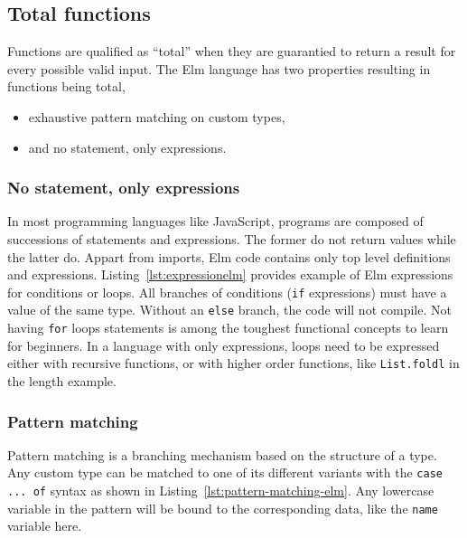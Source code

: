 


\subsection{Total functions}%
\label{sub:total_functions}

Functions are qualified as ``total'' when they are guarantied
to return a result for every possible valid input.
The Elm language has two properties resulting in functions being total,
\begin{itemize}
	\item exhaustive pattern matching on custom types,
	\item and no statement, only expressions.
\end{itemize}

\subsubsection{No statement, only expressions}%
\label{ssub:no_statement_only_expressions}

In most programming languages like JavaScript,
programs are composed of successions of statements and expressions.
The former do not return values while the latter do.
Appart from imports, Elm code contains only top level definitions and expressions.
Listing~\ref{lst:expressionelm} provides example of Elm expressions
for conditions or loops.
All branches of conditions (\verb|if| expressions) must have a value of the same type.
Without an \verb|else|  branch, the code will not compile.
Not having \verb|for| loops statements is among the toughest functional
concepts to learn for beginners.
In a language with only expressions,
loops need to be expressed either with recursive functions,
or with higher order functions, like \verb|List.foldl| in the length example.




\subsubsection{Pattern matching}%
\label{ssub:pattern_matching}

Pattern matching is a branching mechanism based on the structure of a type.
Any custom type can be matched to one of its different variants
with the \verb|case ... of| syntax as shown in Listing~\ref{lst:pattern-matching-elm}.
Any lowercase variable in the pattern will be bound to the corresponding data,
like the \verb|name| variable here.

